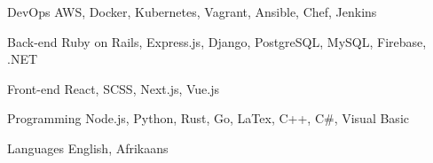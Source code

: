 

\begin{cvskills}

  \cvskill
    {DevOps} %
    {AWS, Docker, Kubernetes, Vagrant, Ansible, Chef, Jenkins} %

  \cvskill
    {Back-end} %
    {Ruby on Rails, Express.js, Django, PostgreSQL, MySQL, Firebase, .NET} %

  \cvskill
    {Front-end} %
    {React, SCSS, Next.js, Vue.js}%

  \cvskill
    {Programming} %
    {Node.js, Python, Rust, Go, LaTex, C++, C#, Visual Basic} %

  \cvskill
    {Languages} %
    {English, Afrikaans} %

\end{cvskills}
